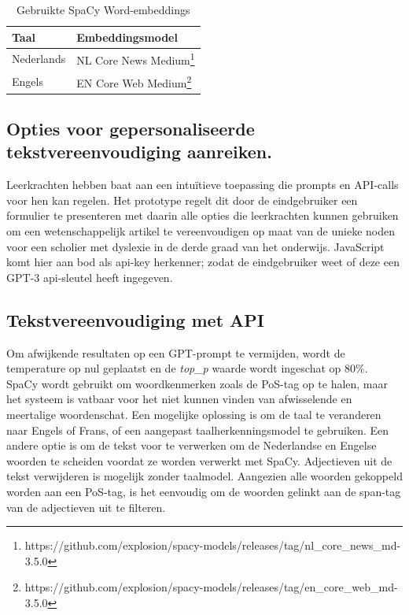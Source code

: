 \begin{center}
	\begin{table}
		\begin{tabular}{ | m{4cm} | m{12cm} | } 
			\hline
			\textbf{Taal} & \textbf{Embeddingsmodel} \\
			\hline
			Nederlands & NL Core News Medium\footnote{https://github.com/explosion/spacy-models/releases/tag/nl\_core\_news\_md-3.5.0} \\ 
			\hline
			Engels & EN Core Web Medium\footnote{https://github.com/explosion/spacy-models/releases/tag/en\_core\_web\_md-3.5.0} \\
			\hline
		\end{tabular}
		\label{table:wordembeddings-spacy}
		\caption{Gebruikte SpaCy Word-embeddings}
	\end{table}
	
\end{center}

\subsection{Opties voor gepersonaliseerde tekstvereenvoudiging aanreiken.}

Leerkrachten hebben baat aan een intuïtieve toepassing die prompts en API-calls voor hen kan regelen. Het prototype regelt dit door de eindgebruiker een formulier te presenteren met daarin alle opties die leerkrachten kunnen gebruiken om een wetenschappelijk artikel te vereenvoudigen op maat van de unieke noden voor een scholier met dyslexie in de derde graad van het onderwijs. JavaScript komt hier aan bod als api-key herkenner; zodat de eindgebruiker weet of deze een GPT-3 api-sleutel heeft ingegeven.


\subsection{Tekstvereenvoudiging met API}

Om afwijkende resultaten op een GPT-prompt te vermijden, wordt de temperature op nul geplaatst en de \textit{top\_p} waarde wordt ingeschat op 80\%. SpaCy wordt gebruikt om woordkenmerken zoals de PoS-tag op te halen, maar het systeem is vatbaar voor het niet kunnen vinden van afwisselende en meertalige woordenschat. Een mogelijke oplossing is om de taal te veranderen naar Engels of Frans, of een aangepast taalherkenningsmodel te gebruiken. Een andere optie is om de tekst voor te verwerken om de Nederlandse en Engelse woorden te scheiden voordat ze worden verwerkt met SpaCy. Adjectieven uit de tekst verwijderen is mogelijk zonder taalmodel. Aangezien alle woorden gekoppeld worden aan een PoS-tag, is het eenvoudig om de woorden gelinkt aan de span-tag van de adjectieven uit te filteren.

